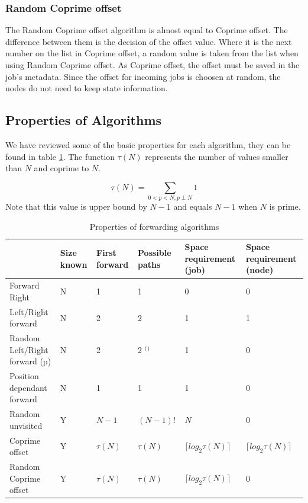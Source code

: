 \documentclass[10pt,a4paper]{article}
\begin{document}
\subsubsection*{Random Coprime offset}
The Random Coprime offset algorithm is almost equal to Coprime offset. The difference between them is the decision of the offset value. Where it is the next number on the list in Coprime offset, a random value is taken from the list when using Random Coprime offset. As Coprime offset, the offset must be saved in the job's metadata. Since the offset for incoming jobs is choosen at random, the nodes do not need to keep state information.

\subsection{Properties of Algorithms}

We have reviewed some of the basic properties for each algorithm, they can be found in table \ref{tabprops}. The function $\tau(N)$ represents the number of values smaller than $N$ and coprime to $N$.

\[ \tau(N) = \sum_{0 < p < N, p \perp N} 1\]
Note that this value is upper bound by $N-1$ and equals $N-1$ when $N$ is prime.

\begin{table}[h!]
\hspace{-0.12\textwidth}
\begin{tabular}{|p{}|p{}|p{}|p{}|p{}|p{}|} \cline{2-6}
\multicolumn{1}{l|}{}		& Size known	& First forward	& Possible paths	& Space requirement (job)	& Space requirement (node) \\ \hline
Forward Right				& N				& 1				& 1					& 0							& 0		\\ \hline
Left/Right forward			& N				& 2				& 2					& 1							& 1		\\ \hline
Random Left/Right forward (p) & N			& 2				& 2 $^($\footnotemark$^)$ & 1					& 0		\\ \hline
Position dependant forward	& N				& 1				& 1					& 1							& 0		\\ \hline
Random unvisited			& Y				& $N-1$			& $(N-1)!$			& $N$	& 0		\\ \hline
Coprime offset				& Y				& $\tau(N)$		& $\tau(N)$ 		& $\lceil log_2 \tau(N) \rceil$	& $\lceil log_2 \tau(N) \rceil$ \\ \hline
Random Coprime offset		& Y				& $\tau(N)$		& $\tau(N)$			& $\lceil log_2 \tau(N) \rceil$	& 0		\\ \hline
\end{tabular}
\caption{Properties of forwarding algorithms}
\label{tabprops}
\end{table}
\end{document}
